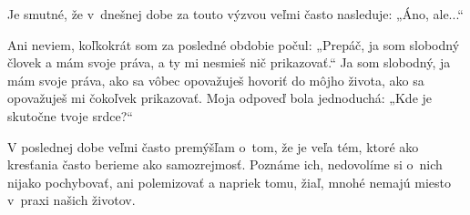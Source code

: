 







Je smutné, že v~dnešnej dobe za touto výzvou veľmi často nasleduje: „Áno, ale...“

Ani neviem, koľkokrát som za posledné obdobie počul: „Prepáč, ja som slobodný človek a mám svoje práva, a ty mi nesmieš nič prikazovať.“ Ja som slobodný, ja mám svoje práva, ako sa vôbec opovažuješ hovoriť do môjho života, ako sa opovažuješ mi čokoľvek prikazovať. Moja odpoveď bola jednoduchá: „Kde je skutočne tvoje srdce?“

V poslednej dobe veľmi často premýšľam o~tom, že je veľa tém, ktoré ako kresťania často berieme ako samozrejmosť. Poznáme ich, nedovolíme si o~nich nijako pochybovať, ani polemizovať a napriek tomu, žiaľ, mnohé nemajú miesto v~praxi našich životov.

